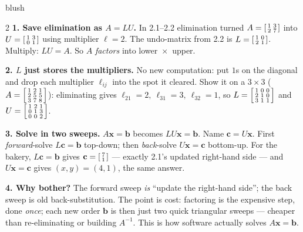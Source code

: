 \documentclass[10pt]{article}
\newcommand{\xx}{\mathbf{x}}
\newcommand{\bb}{\mathbf{b}}
\newcommand{\cc}{\mathbf{c}}
\begin{document}
\begin{skillbox}[Lesson]{blush}
\begin{multicols}{2}
\textbf{1. Save elimination as $A=LU$.} In 2.1--2.2 elimination turned $A=\begin{bsmallmatrix} 1&3\\2&7 \end{bsmallmatrix}$
into $U=\begin{bsmallmatrix} 1&3\\0&1 \end{bsmallmatrix}$ using multiplier $\ell=2$. The undo-matrix from
2.2 is $L=\begin{bsmallmatrix} 1&0\\2&1 \end{bsmallmatrix}$. Multiply: $LU=A$. So $A$ \emph{factors} into
lower~$\times$~upper.

\textbf{2. $L$ just stores the multipliers.} No new computation: put $1$s on the diagonal and drop each
multiplier $\ell_{ij}$ into the spot it cleared. Show it on a $3\times3$
($A=\begin{bsmallmatrix} 1&2&1\\2&5&5\\3&7&8 \end{bsmallmatrix}$): eliminating gives
$\ell_{21}=2,\ \ell_{31}=3,\ \ell_{32}=1$, so $L=\begin{bsmallmatrix} 1&0&0\\2&1&0\\3&1&1 \end{bsmallmatrix}$
and $U=\begin{bsmallmatrix} 1&2&1\\0&1&3\\0&0&2 \end{bsmallmatrix}$.

\columnbreak

\textbf{3. Solve in two sweeps.} $A\xx=\bb$ becomes $LU\xx=\bb$. Name $\cc=U\xx$. First
\emph{forward}-solve $L\cc=\bb$ top-down; then \emph{back}-solve $U\xx=\cc$ bottom-up. For the bakery,
$L\cc=\bb$ gives $\cc=\begin{bsmallmatrix} 7\\1 \end{bsmallmatrix}$ --- exactly 2.1's updated right-hand
side --- and $U\xx=\cc$ gives $(x,y)=(4,1)$, the same answer.

\textbf{4. Why bother?} The forward sweep \emph{is} ``update the right-hand side''; the back sweep is
old back-substitution. The point is cost: factoring is the expensive step, done \emph{once}; each new
order $\bb$ is then just two quick triangular sweeps --- cheaper than re-eliminating or building
$A^{-1}$. This is how software actually solves $A\xx=\bb$.
\end{multicols}
\end{skillbox}
\end{document}
